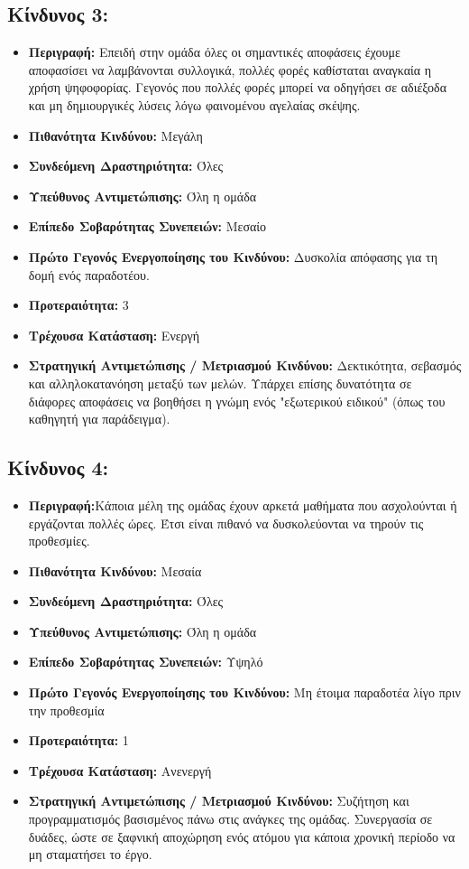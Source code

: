 \documentclass[12pt,a4paper]{article}
\begin{document}
\subsection*{Κίνδυνος 3:}
\begin{itemize}
	\item \textbf{Περιγραφή:} Επειδή στην ομάδα όλες οι σημαντικές αποφάσεις έχουμε αποφασίσει να λαμβάνονται συλλογικά, πολλές φορές καθίσταται αναγκαία η χρήση ψηφοφορίας. Γεγονός που πολλές φορές μπορεί να οδηγήσει σε αδιέξοδα και μη δημιουργικές λύσεις λόγω φαινομένου αγελαίας σκέψης.
	\item \textbf{Πιθανότητα Κινδύνου:} Μεγάλη
	\item \textbf{Συνδεόμενη Δραστηριότητα:} Όλες
	\item \textbf{Υπεύθυνος Αντιμετώπισης:} Όλη η ομάδα
	\item \textbf{Επίπεδο Σοβαρότητας Συνεπειών:} Μεσαίο
	\item \textbf{Πρώτο Γεγονός Ενεργοποίησης του Κινδύνου:} Δυσκολία απόφασης για τη δομή ενός παραδοτέου.
	\item \textbf{Προτεραιότητα:} 3
	\item \textbf{Τρέχουσα Κατάσταση:} Ενεργή
	\item \textbf{Στρατηγική Αντιμετώπισης / Μετριασμού Κινδύνου:} Δεκτικότητα, σεβασμός και αλληλοκατανόηση μεταξύ των μελών. Υπάρχει επίσης δυνατότητα σε διάφορες αποφάσεις να βοηθήσει η γνώμη ενός "εξωτερικού ειδικού" (όπως του καθηγητή για παράδειγμα).
\end{itemize}

\subsection*{Κίνδυνος 4:}
\begin{itemize}
	\item \textbf{Περιγραφή:}Κάποια μέλη της ομάδας έχουν αρκετά μαθήματα που ασχολούνται ή εργάζονται πολλές ώρες. Έτσι είναι πιθανό να δυσκολεύονται να τηρούν τις προθεσμίες. 
	\item \textbf{Πιθανότητα Κινδύνου:} Μεσαία
	\item \textbf{Συνδεόμενη Δραστηριότητα:} Όλες
	\item \textbf{Υπεύθυνος Αντιμετώπισης:} Όλη η ομάδα
	\item \textbf{Επίπεδο Σοβαρότητας Συνεπειών:} Υψηλό
	\item \textbf{Πρώτο Γεγονός Ενεργοποίησης του Κινδύνου:} Μη έτοιμα παραδοτέα λίγο πριν την προθεσμία
	\item \textbf{Προτεραιότητα:} 1
	\item \textbf{Τρέχουσα Κατάσταση:} Ανενεργή
	\item \textbf{Στρατηγική Αντιμετώπισης / Μετριασμού Κινδύνου:} Συζήτηση και προγραμματισμός βασισμένος πάνω στις ανάγκες της ομάδας. Συνεργασία σε δυάδες, ώστε σε ξαφνική αποχώρηση ενός ατόμου για κάποια χρονική περίοδο να μη σταματήσει το έργο.
\end{itemize}
\end{document}
